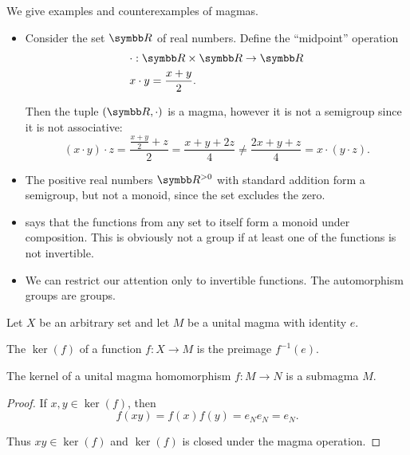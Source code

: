 \begin{example}\label{ex:magmas}
  We give examples and counterexamples of magmas.

  \begin{itemize}
    \item Consider the set \( \R \) of real numbers. Define the \enquote{midpoint} operation
    \begin{align*}
      &\cdot: \R \times \R \to \R \\
      &x \cdot y = \frac {x + y} 2.
    \end{align*}

    Then the tuple \( (\R, \cdot) \) is a magma, however it is not a semigroup since it is not associative:
    \begin{equation*}
      (x \cdot y) \cdot z = \frac {{\frac {x + y} 2} + z} 2 = \frac {x + y + 2z} 4
      \neq
      \frac {2x + y + z} 4 = x \cdot (y \cdot z).
    \end{equation*}

    \item The positive real numbers \( \R^{>0} \) with standard addition form a semigroup, but not a monoid, since the set excludes the zero.

    \item {} says that the functions from any set to itself form a monoid under composition. This is obviously not a group if at least one of the functions is not invertible.

    \item We can restrict our attention only to invertible functions. The automorphism groups are groups.
  \end{itemize}
\end{example}

\begin{definition}\label{def:unital_magma_kernel}
  Let \( X \) be an arbitrary set and let \( M \) be a unital magma with identity \( e \).

  The  \( \ker(f) \) of a function \( f: X \to M \) is the preimage \( f^{-1}(e) \).
\end{definition}

\begin{proposition}\label{thm:unital_magma_kernel_is_submonoid}
  The kernel of a unital magma homomorphism \( f: M \to N \) is a submagma \( M \).
\end{proposition}
\begin{proof}
  If \( x, y \in \ker(f) \), then
  \begin{equation*}
    f(xy) = f(x) f(y) = e_N e_N = e_N.
  \end{equation*}

  Thus \( xy \in \ker(f) \) and \( \ker(f) \) is closed under the magma operation.
\end{proof}

